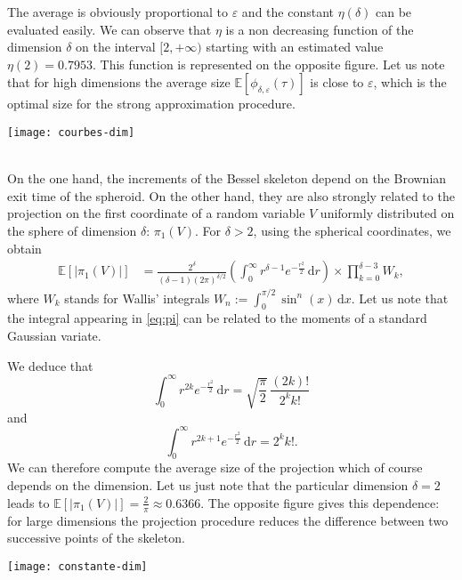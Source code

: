 \documentclass[12pt]{article}
\newcommand{\dint}{\mathrm{d}}
\numberwithin{equation}{section}
\begin{document}
\noindent\begin{minipage}{7.5cm}
The average is obviously proportional to $\varepsilon$ and the constant $\eta(\delta)$ can be evaluated easily. We can observe that $\eta$ is a non decreasing function of the dimension $\delta$ on the interval $[2,+\infty)$ starting with an estimated value $\eta(2)=0.7953$. This function is represented on the opposite figure. Let us note that for high dimensions the average size $\mathbb{E}[\phi_{\delta,\varepsilon}(\tau)]$ is close to $\varepsilon$, which is the optimal size for the strong approximation procedure. 
\end{minipage}\hspace*{1.5cm}
\begin{minipage}{7cm}
\centerline{\texttt{[image: courbes-dim]}}
\end{minipage}\\[4pt]
On the one hand, the increments of the Bessel skeleton depend on the Brownian exit time of the spheroid. On the other hand, they are also strongly related to the projection on the first coordinate of a random variable $V$ uniformly distributed on the sphere of dimension $\delta$: $\pi_1(V)$. For $\delta>2$, using the spherical coordinates, we obtain
\begin{align}
\label{eq:pi}
\mathbb{E}[|\pi_1(V)|]&=\frac{2^{\delta}}{(\delta-1)(2\pi)^{\delta/2}}\left( \int_0^\infty r^{\delta-1}e^{-\frac{r^2}{2}}\,\dint r \right)\times \prod_{k=0}^{\delta-3}W_{k},
\end{align}
where $W_k$ stands for Wallis' integrals $W_n:=\int_0^{\pi/2}\sin^n(x)\,\dint x$. 
Let us note that the integral appearing in \eqref{eq:pi} can be related to the moments of a standard Gaussian variate. \\[4pt]
\begin{minipage}{7.5cm}
We deduce that
\[
\int_0^\infty r^{2k}e^{-\frac{r^2}{2}}\,\dint r=\sqrt{\frac{\pi}{2}}\,\frac{(2k)!}{2^kk!}
\]
and
\[
\int_0^\infty r^{2k+1}e^{-\frac{r^2}{2}}\,\dint r=2^kk!.
\]
We can therefore compute the average size of the projection which of course depends on the dimension. Let us just note that the particular dimension $\delta=2$ leads to $\mathbb{E}[|\pi_1(V)|]=\frac{2}{\pi}\approx  0.6366$. The opposite figure gives this dependence: for large dimensions the projection procedure reduces the difference between two successive points of the skeleton.
\end{minipage}\hspace*{1.5cm}
\begin{minipage}{8.5cm}
\centerline{\texttt{[image: constante-dim]}}
\end{minipage}\\[4pt]
 
\end{document}
